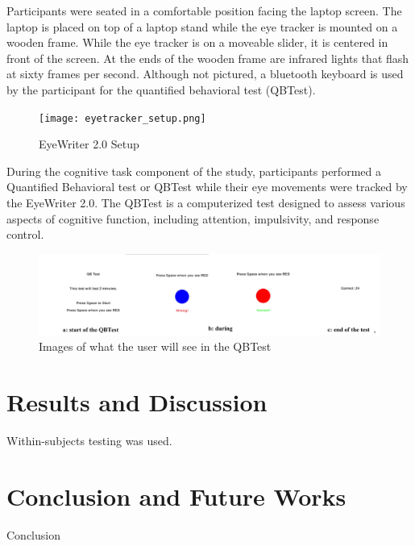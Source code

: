 \documentclass[manuscript, screen, review]{acmart} %
\begin{document}
Participants were seated in a comfortable position facing the laptop screen.
The laptop is placed on top of a laptop stand while the eye tracker is mounted on a wooden frame. 
While the eye tracker is on a moveable slider, it is centered in front of the screen. 
At the ends of the wooden frame are infrared lights that flash at sixty frames per second. %
Although not pictured, a bluetooth keyboard is used by the participant for the quantified behavioral test (QBTest).

\begin{figure}
  \texttt{[image: eyetracker\_setup.png]}
  \caption{EyeWriter 2.0 Setup}
\end{figure}

During the cognitive task component of the study, participants performed a Quantified Behavioral test or QBTest while their eye movements were tracked by the EyeWriter 2.0.
The QBTest is a computerized test designed to assess various aspects of cognitive function, including attention, impulsivity, and response control.

\begin{figure}
  \includegraphics[width=\textwidth]{qbTest.png}
  \caption{Images of what the user will see in the QBTest}
\end{figure}

\section{Results and Discussion}
Within-subjects testing was used.

\section{Conclusion and Future Works}
Conclusion



\end{document}
